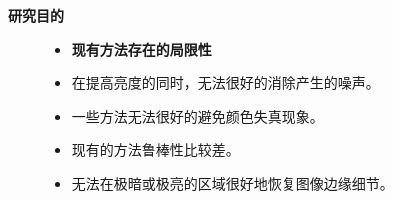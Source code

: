 \documentclass[CJK,aspectratio=169]{beamer}  %
\begin{document}
	\begin{frame}
		{ \yahei \textbf{研究目的}}
		
		\begin{figure}
		\begin{minipage}{.4\columnwidth}
			\begin{itemize}
				\item {} \yahei \textbf{现有方法存在的局限性}
				
				\item[\XSolidBrush]
				 \yahei 在提高亮度的同时，无法很好的消除产生的噪声。
				
				\item[\XSolidBrush]
				 \yahei 一些方法无法很好的避免颜色失真现象。
				
				\item[\XSolidBrush]
				 \yahei 现有的方法鲁棒性比较差。
				\item[\XSolidBrush]
				 \yahei 无法在极暗或极亮的区域很好地恢复图像边缘细节\textcolor{blue}{\citep{xu2023low}}。
				
				\vspace{0.2cm}
				

\end{itemize}
\end{minipage}
\end{figure}
\end{frame}
\end{document}
